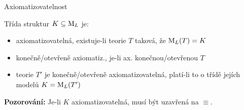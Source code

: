 \documentclass{beamer}
\begin{document}
\begin{frame}{Axiomatizovatelnost}
    
    \pause
    Třída struktur $K\subseteq\operatorname{M}_L$ je:
    
    \pause
    \begin{itemize}
        \item \alert{axiomatizovatelná}, existuje-li teorie $T$ taková, že $\operatorname{M}_L(T)=K$\pause
        \item \alert{konečně}/\alert{otevřeně} axiomatiz., je-li ax. konečnou/otevřenou $T$\pause
        \item teorie $T'$ je \alert{konečně}/\alert{otevřeně} axiomatizovatelná, platí-li to o třídě jejích modelů $K=\operatorname{M}_L(T')$
    \end{itemize}

    \pause
    \textbf{Pozorování:} Je-li $K$ axiomatizovatelná, musí být uzavřená na $\equiv$.

    \medskip
    
    \pause

\end{frame}
\end{document}
